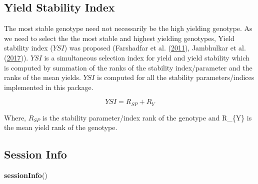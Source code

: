 \documentclass[]{article}
\newenvironment{Shaded}{\begin{snugshade}}{\end{snugshade}}
\newcommand{\KeywordTok}[1]{\textcolor[rgb]{0.13,0.29,0.53}{\textbf{#1}}}
\newcommand{\NormalTok}[1]{#1}
\begin{document}
\newpage

\hypertarget{yield-stability-index}{%
\subsection{Yield Stability Index}\label{yield-stability-index}}

The most stable genotype need not necessarily be the high yielding
genotype. As we need to select the the most stable and highest yielding
genotypes, Yield stability index (\(YSI\)) was proposed (Farshadfar et
al. (\protect\hyperlink{ref-farshadfar_ammi_2011}{2011}), Jambhulkar et
al. (\protect\hyperlink{ref-jambhulkar_stability_2017}{2017})). \(YSI\)
is a simultaneous selection index for yield and yield stability which is
computed by summation of the ranks of the stability index/parameter and
the ranks of the mean yields. \(YSI\) is computed for all the stability
parameters/indices implemented in this package.

\[YSI = R_{SP} + R_{Y}\]

Where, \(R_{SP}\) is the stability parameter/index rank of the genotype
and R\_\{Y\} is the mean yield rank of the genotype.

\hypertarget{session-info}{%
\subsection{Session Info}\label{session-info}}

\begin{Shaded}
\begin{Highlighting}[]
\KeywordTok{sessionInfo}\NormalTok{()}
\end{Highlighting}
\end{Shaded}
\end{document}
